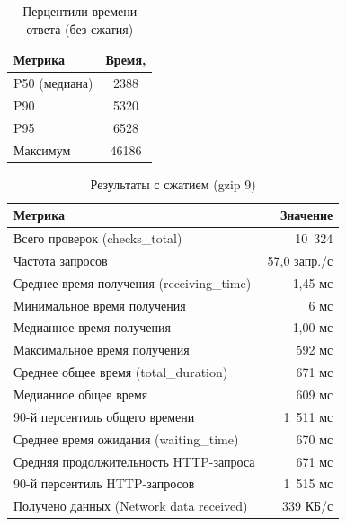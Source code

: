 \documentclass[12pt]{article}
\begin{document}
\begin{table}[H]
    \centering
    \caption{Перцентили времени ответа (без сжатия)}
    \begin{tabular}{lS[table-format=5.5]}
        \toprule
        \textbf{Метрика} & \textbf{Время, } \\
        \midrule
        P50 (медиана)    & 2388                      \\
        P90              & 5320                      \\
        P95              & 6528                      \\
        Максимум         & 46186                     \\
        \bottomrule
    \end{tabular}
\end{table}

\begin{table}[H]
    \centering
    \caption{Результаты с сжатием (gzip 9)}
    \begin{tabular}{lr}
        \toprule
        \textbf{Метрика}                          & \textbf{Значение} \\
        \midrule
        Всего проверок (checks\_total)            & 10~324            \\
        Частота запросов                          & 57,0 запр./с      \\
        Среднее время получения (receiving\_time) & 1,45 мс           \\
        Минимальное время получения               & 6 мс              \\
        Медианное время получения                 & 1,00 мс           \\
        Максимальное время получения              & 592 мс            \\
        Среднее общее время (total\_duration)     & 671 мс            \\
        Медианное общее время                     & 609 мс            \\
        90-й персентиль общего времени            & 1~511 мс          \\
        Среднее время ожидания (waiting\_time)    & 670 мс            \\
        Средняя продолжительность HTTP-запроса    & 671 мс            \\
        90-й персентиль HTTP-запросов             & 1~515 мс          \\
        Получено данных (Network data received)   & 339 КБ/с          \\
        \bottomrule
    \end{tabular}
\end{table}
\end{document}
